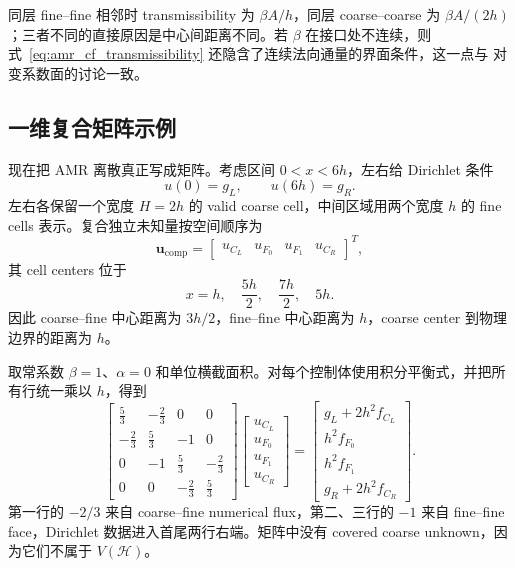 同层 fine--fine 相邻时 transmissibility 为 $\beta A/h$，同层 coarse--coarse 为 $\beta A/(2h)$；三者不同的直接原因是中心间距离不同。若 $\beta$ 在接口处不连续，则式~\eqref{eq:amr_cf_transmissibility} 还隐含了连续法向通量的界面条件，这一点与 对变系数面的讨论一致。

\subsection{一维复合矩阵示例}

现在把 AMR 离散真正写成矩阵。考虑区间 $0<x<6h$，左右给 Dirichlet 条件
\begin{equation}
u(0)=g_L,
\qquad
u(6h)=g_R.
\end{equation}
左右各保留一个宽度 $H=2h$ 的 valid coarse cell，中间区域用两个宽度 $h$ 的 fine cells 表示。复合独立未知量按空间顺序为
\begin{equation}
\bm u_{\mathrm{comp}}
=
\begin{bmatrix}
u_{C_L}&u_{F_0}&u_{F_1}&u_{C_R}
\end{bmatrix}^T,
\end{equation}
其 cell centers 位于
\begin{equation}
x=h,
\quad \frac{5h}{2},
\quad \frac{7h}{2},
\quad 5h.
\end{equation}
因此 coarse--fine 中心距离为 $3h/2$，fine--fine 中心距离为 $h$，coarse center 到物理边界的距离为 $h$。

取常系数 $\beta=1$、$\alpha=0$ 和单位横截面积。对每个控制体使用积分平衡式，并把所有行统一乘以 $h$，得到
\begin{equation}
\boxed{
\begin{bmatrix}
\frac53&-\frac23&0&0\\
-\frac23&\frac53&-1&0\\
0&-1&\frac53&-\frac23\\
0&0&-\frac23&\frac53
\end{bmatrix}
\begin{bmatrix}
u_{C_L}\\u_{F_0}\\u_{F_1}\\u_{C_R}
\end{bmatrix}
=
\begin{bmatrix}
g_L+2h^2f_{C_L}\\
h^2f_{F_0}\\
h^2f_{F_1}\\
g_R+2h^2f_{C_R}
\end{bmatrix}.
}
\label{eq:amr-explicit-one-dimensional-matrix}
\end{equation}
第一行的 $-2/3$ 来自 coarse--fine numerical flux，第二、三行的 $-1$ 来自 fine--fine face，Dirichlet 数据进入首尾两行右端。矩阵中没有 covered coarse unknown，因为它们不属于 $V(\mathcal H)$。

